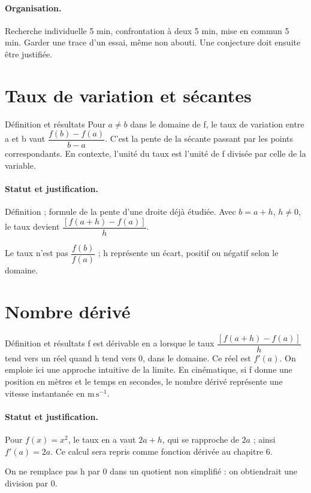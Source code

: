 \paragraph{Organisation.} Recherche individuelle 5 min, confrontation à deux 5 min, mise en commun 5 min. Garder une trace d’un essai, même non abouti. Une conjecture doit ensuite être justifiée.
\section{Taux de variation et sécantes}\label{C04-U1}
\begin{repere}{Définition et résultats}
Pour $a\ne b$ dans le domaine de f, le taux de variation entre a et b vaut $\dfrac{f(b)-f(a)}{b-a}$. C’est la pente de la sécante passant par les points correspondants. En contexte, l’unité du taux est l’unité de f divisée par celle de la variable.
\end{repere}
\paragraph{Statut et justification.} Définition ; formule de la pente d’une droite déjà étudiée. Avec $b=a+h$, $h\ne0$, le taux devient $\dfrac{[f(a+h)-f(a)]}{h}$.
\label{C04-EX1}
\begin{erreur}Le taux n’est pas $\dfrac{f(b)}{f(a)}$ ; h représente un écart, positif ou négatif selon le domaine.\end{erreur}
\label{C04-AP1}
\section{Nombre dérivé}\label{C04-U2}
\begin{repere}{Définition et résultats}
f est dérivable en a lorsque le taux $\dfrac{[f(a+h)-f(a)]}{h}$ tend vers un réel quand h tend vers 0, dans le domaine. Ce réel est $f\prime(a)$. On emploie ici une approche intuitive de la limite. En cinématique, si f donne une position en mètres et le temps en secondes, le nombre dérivé représente une vitesse instantanée en $\mathrm{m\,s^{-1}}$.
\end{repere}
\paragraph{Statut et justification.} Pour $f(x)=x^2$, le taux en a vaut $2a+h$, qui se rapproche de $2a$ ; ainsi $f\prime(a)=2a$. Ce calcul sera repris comme fonction dérivée au chapitre 6.
\label{C04-EX2}
\begin{erreur}On ne remplace pas h par 0 dans un quotient non simplifié : on obtiendrait une division par 0.\end{erreur}
\label{C04-AP2}
